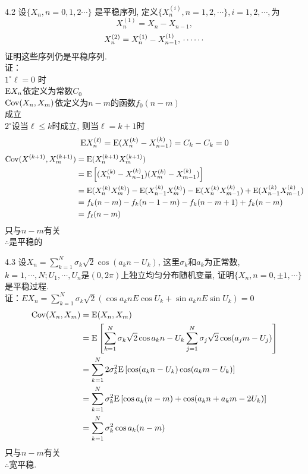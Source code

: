 4.2 设$\{X_n, n = 0,1,2\cdots\}$ 是平稳序列, 定义$\{X^{(i)}_n, n = 1,2,\cdots\}, i = 1, 2, \cdots, $为
	\[
	X^{(1)}_n = X_n - X_{n-1},
	\]
	\[
	X^{(2)}_n = X^{(1)}_n - X^{(1)}_{n-1},\\
	\cdots\cdots
	\]
	证明这些序列仍是平稳序列.\\
证：\\
	$1^\circ \ell = 0$ 时\\
	$\mathrm{E} X_n$依定义为常数$C_0$\\
	$\mathrm{Cov}(X_n, X_m)$依定义为$n-m$的函数$f_0(n-m)$\\
	成立\\
	$2^\circ$设当$\ell \leqslant k$时成立, 则当$\ell = k + 1$时\\
	\[
	\mathrm{E} X^{(\ell)}_n = \mathrm{E}(X^{(k)}_n - X^{(k)}_{n-1}) = C_k - C_k = 0
	\]
	\[
	\begin{split}
	\mathrm{Cov}(X^{(k+1)}, X^{(k+1)}_m) & = \mathrm{E}(X^{(k+1)}_nX^{(k+1)}_m)\\
								& = \mathrm{E}\left[(X^{(k)}_n - X^{(k)}_{n-1})(X^{(k)}_m - X^{(k)}_{m-1})\right]\\
								& = \mathrm{E}(X^{(k)}_nX^{(k)}_m) - \mathrm{E}(X^{(k)}_{n-1}X^{(k)}_m) - \mathrm{E}(X^{(k)}_{n}X^{(k)}_{m-1}) + \mathrm{E}(X^{(k)}_{n-1}X^{(k)}_{m-1})\\
								& = f_k(n-m) - f_k(n-1-m) - f_k(n-m+1) + f_k(n-m)\\
								& = f_{\ell}(n-m)
	\end{split}
	\]
	只与$n-m$有关\\
	$\therefore$是平稳的


4.3 设$X_n = \sum\limits^N_{k=1}\sigma_k\sqrt{2}\cos(a_kn-U_k)$, 这里$\sigma_k$和$a_k$为正常数, $k=1, \cdots, N;U_1, \cdots, U_n$是$(0,2\pi)$上独立均匀分布随机变量, 证明$\{X_n, n = 0, \pm 1, \cdots\}$是平稳过程.\\
证：$EX_n = \sum\limits^N_{k=1}\sigma_k\sqrt{2}(\cos a_knE\cos U_k + \sin a_knE\sin U_k) = 0$\\
	\[
	\begin{split}
	\mathrm{Cov}(X_n, X_m) & = \mathrm{E}(X_n, X_m)\\
				& = \mathrm{E}\left[\sum^N_{k=1}\sigma_k\sqrt{2}\cos a_kn-U_k\sum^N_{j=1}\sigma_j\sqrt{2}\cos (a_jm-U_j)\right]\\
				& = \sum^N_{k=1}2\sigma^2_k\mathrm{E}\left[\cos(a_kn-U_k)\cos(a_km-U_k)\right]\\
				& = \sum^N_{k=1}\sigma^2_k\mathrm{E}\left[\cos a_k(n-m) + \cos(a_kn + a_km - 2U_k)\right]\\
				& = \sum^N_{k=1}\sigma^2_k\cos a_k(n-m)\\
	\end{split}
	\]
	只与$n-m$有关\\
	$\therefore$宽平稳.


